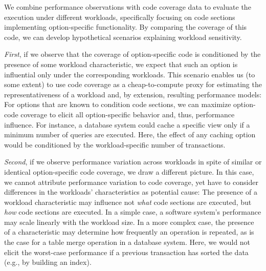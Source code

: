 {{{%
We combine performance observations with code coverage data to evaluate the execution under different workloads, specifically focusing on code sections implementing option-specific functionality. By comparing the coverage of this code, we can develop hypothetical scenarios explaining workload sensitivity.

\textit{First}, if we observe that the  coverage of option-specific code is conditioned by the presence of some workload characteristic, we expect that such an option is influential only under the corresponding workloads. This scenario enables us (to some extent) to use code coverage as a cheap-to-compute proxy for estimating the representativeness of a workload and, by extension, resulting performance models: For options that are known to condition code sections, we can maximize option-code coverage to elicit all option-specific behavior and, thus, performance influence. For instance, a database system could cache a specific view only if a minimum number of queries are executed. Here, the effect of any caching option would be conditioned by the workload-specific number of transactions.

\textit{Second}, if we observe performance variation across workloads in spite of similar or identical option-specific code coverage, we draw a different picture. In this case, we cannot attribute performance variation to code coverage, yet have to consider differences in the workloads’ characteristics as potential cause: The presence of a workload characteristic may influence not  \emph{what} code sections are executed, but \emph{how} code sections are executed. In a simple case, a software system’s performance may scale linearly with the workload size. In a more complex case, the presence of a characteristic may determine how frequently an operation is repeated, as is the case for a table merge operation in a database system. Here, we would not elicit the worst-case performance if a previous transaction has sorted the data (e.g., by building an index).
\color{black}

}}}
